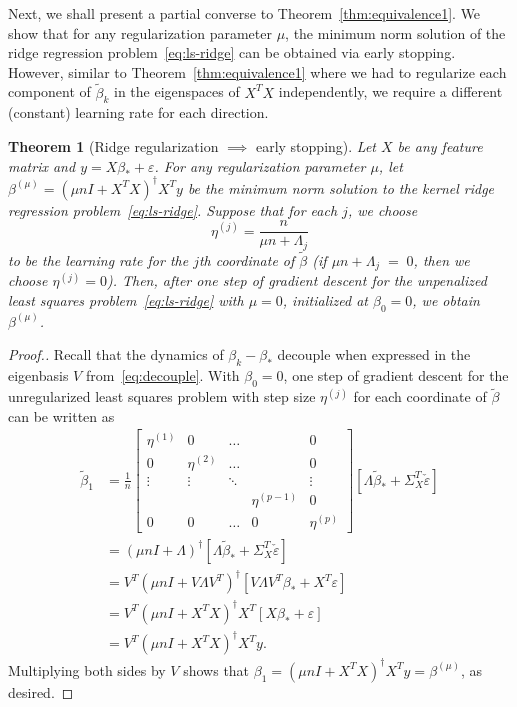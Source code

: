 \documentclass[11pt]{article}
\newtheorem{theorem}{Theorem}
\begin{document}
Next, we shall present a partial converse to Theorem~\ref{thm:equivalence1}. We show that for any regularization parameter $\mu$, the minimum norm solution of the ridge regression problem~\eqref{eq:ls-ridge} can be obtained via early stopping. However, similar to Theorem~\ref{thm:equivalence1} where we had to regularize each component of $\tilde{\beta}_k$ in the eigenspaces of $X^T X$ independently, we require a different (constant) learning rate for each direction.

\begin{theorem}[Ridge regularization $\implies$ early stopping]\label{thm:equivalence2}
Let $X$ be any feature matrix and $y = X \beta_* + \varepsilon$. For any regularization parameter $\mu$, let $\beta^{(\mu)} = \left(\mu n I + X^TX\right)^{\dagger} X^T y$ be the minimum norm solution to the kernel ridge regression problem~\eqref{eq:ls-ridge}. Suppose that for each $j$, we choose
\[
    \eta^{(j)} = \frac{n}{\mu n + \Lambda_j}
\]
to be the learning rate for the $j$th coordinate of $\tilde{\beta}$ (if $\mu n + \Lambda_j \;=\; 0$, then we choose $\eta^{(j)} = 0$). Then, after one step of gradient descent for the unpenalized least squares problem~\eqref{eq:ls-ridge} with $\mu = 0$, initialized at $\beta_0 = 0$, we obtain $\beta^{(\mu)}$.
\end{theorem}

\begin{proof}[Proof.]
Recall that the dynamics of $\beta_k - \beta_*$ decouple when expressed in the eigenbasis $V$ from~\eqref{eq:decouple}.
With $\beta_0 = 0$, one step of gradient descent for the unregularized least squares problem with step size $\eta^{(j)}$ for each coordinate of $\tilde{\beta}$ can be written as
\begin{align*}
    \tilde{\beta}_1
    &= \frac{1}{n} \begin{bmatrix}
        \eta^{(1)} & 0 & \ldots & & 0 \\
        0 & \eta^{(2)} & \ldots & & 0 \\
        \vdots & \vdots & \ddots & & \vdots \\
        & & & \eta^{(p-1)} & 0 \\
        0 & 0 & \ldots & 0 & \eta^{(p)} 
    \end{bmatrix} \left[\Lambda \tilde{\beta}_* + \Sigma_X^T \check{\varepsilon}\right] \\
    &= \left(\mu n I + \Lambda\right)^{\dagger}  \left[\Lambda \tilde{\beta}_* + \Sigma_X^T \check{\varepsilon}\right]\\
    &= V^T\left(\mu n I + V\Lambda V^T\right)^{\dagger}  \left[V\Lambda V^T \beta_* + X^T\varepsilon\right]\\
    &= V^T\left(\mu n I + X^TX\right)^{\dagger}  X^T\left[X\beta_* +\varepsilon\right] \\
    &= V^T\left(\mu n I + X^TX\right)^{\dagger} X^Ty.
\end{align*}
Multiplying both sides by $V$ shows that $\beta_1 = \left(\mu n I + X^TX\right)^{\dagger} X^Ty = \beta^{(\mu)}$, as desired.
\end{proof}
\end{document}
